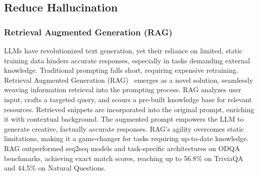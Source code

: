 \documentclass{article}
\begin{document}
\subsection{Reduce Hallucination}
\label{rh}
\subsubsection{Retrieval Augmented Generation (RAG)}
\label{RAG}
LLMs have revolutionized text generation, yet their reliance on limited, static training data hinders accurate responses, especially in tasks demanding external knowledge. Traditional prompting falls short, requiring expensive retraining. Retrieval Augmented Generation (RAG)~\citep{lewis2020retrieval} emerges as a novel solution, seamlessly weaving information retrieval into the prompting process. RAG analyzes user input, crafts a targeted query, and scours a pre-built knowledge base for relevant resources. Retrieved snippets are incorporated into the original prompt, enriching it with contextual background. The augmented prompt empowers the LLM to generate creative, factually accurate responses. RAG's agility overcomes static limitations, making it a game-changer for tasks requiring up-to-date knowledge. RAG outperformed seq2seq models and task-specific architectures on ODQA benchmarks, achieving exact match scores, reaching up to 56.8\% on TriviaQA and 44.5\% on Natural Questions.
\end{document}
